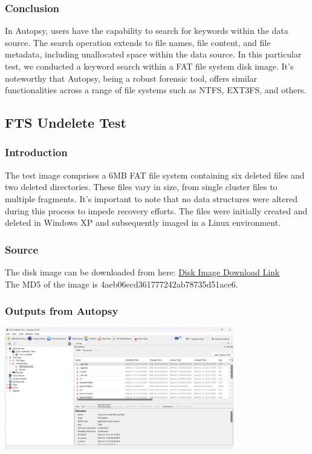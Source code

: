 \documentclass{extarticle}
\begin{document}
\subsubsection*{Conclusion}
In Autopsy, users have the capability to search for keywords within the data source. The search operation extends to file names, file content, and file metadata, including unallocated space within the data source. In this particular test, we conducted a keyword search within a FAT file system disk image. It's noteworthy that Autopsy, being a robust forensic tool, offers similar functionalities across a range of file systems such as NTFS, EXT3FS, and others.

\subsection{FTS Undelete Test}
\subsubsection*{Introduction}
The test image comprises a 6MB FAT file system containing six deleted files and two deleted directories. These files vary in size, from single cluster files to multiple fragments. It's important to note that no data structures were altered during this process to impede recovery efforts. The files were initially created and deleted in Windows XP and subsequently imaged in a Linux environment.

\subsubsection*{Source}
The disk image can be downloaded from here: \href{http://prdownloads.sourceforge.net/dftt/6-undel-fat.zip?download}{Disk Image Download Link} \\
The MD5 of the image is 4aeb06ecd361777242ab78735d51ace6.

\subsubsection*{Outputs from Autopsy}
\begin{center}
    \includegraphics[width=0.75\textwidth]{6/6.3/FTS Deleted Files.png}
\end{center}
\end{document}
